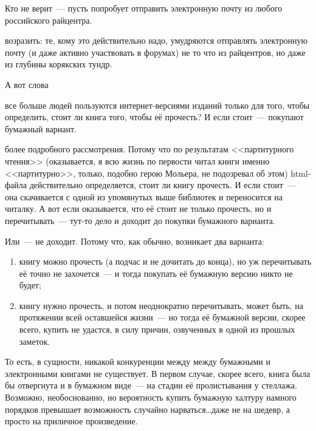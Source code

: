 \begin{shadequote}{}
Кто не верит~--- пусть попробует отправить электронную почту из любого российского райцентра.
\end{shadequote}

 возразить: те, кому это действительно надо, умудряются отправлять электронную почту (и даже активно участвовать в форумах) не то что из райцентров, но даже из глубины корякских тундр.

А вот слова

\begin{shadequote}{}
 все больше людей пользуются интернет-версиями изданий только для того, чтобы определить, стоит ли книга того, чтобы её прочесть? И если стоит~--- покупают бумажный вариант.
\end{shadequote}

 более подробного рассмотрения. Потому что по результатам <<партитурного чтения>> (оказывается, я всю жизнь по первости читал книги именно <<партитурно>>, только, подобно герою Мольера, не подозревал об этом) html-файла действительно определяется, стоит ли книгу прочесть. И если стоит~--- она скачивается с одной из упомянутых выше библиотек и переносится на читалку. А вот если оказывается, что её стоит не только прочесть, но и перечитывать~--- тут-то дело и доходит до покупки бумажного варианта.

Или~--- не доходит. Потому что, как обычно, возникает два варианта:

\begin{enumerate}
	\item книгу можно прочесть (а подчас и не дочитать до конца), но уж перечитывать её точно не захочется~--- и тогда покупать её бумажную версию никто не будет; 
	\item книгу нужно прочесть, и потом неоднократно перечитывать, может быть, на протяжении всей оставшейся жизни~--- но тогда её бумажной версии, скорее всего, купить не удастся, в силу причин, озвученных в одной из прошлых заметок. 
\end{enumerate}

То есть, в сущности, никакой конкуренции между между бумажными и электронными книгами не существует. В первом случае, скорее всего, книга была бы отвергнута и в бумажном виде~--- на стадии её пролистывания у стеллажа. Возможно, необоснованно, но вероятность купить бумажную халтуру намного порядков превышает возможность случайно нарваться\dots даже не на шедевр, а просто на приличное произведение.

